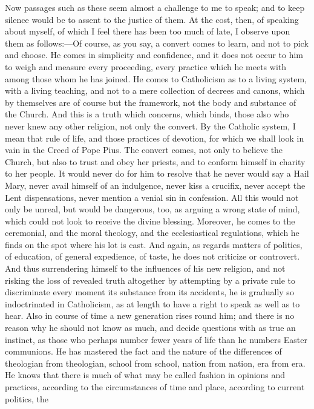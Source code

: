 Now passages such as these seem almost a challenge to me to speak;
and to keep silence would be to assent to the justice of them. At the
cost, then, of speaking about myself, of which I feel there has been too
much of late, I observe upon them as follows:—Of course, as you say, a
convert comes to learn, and not to pick and choose. He comes in
simplicity and confidence, and it does not occur to him to weigh and
measure every proceeding, every practice which he meets with among those
whom he has joined. He comes to Catholicism as to a living system, with
a living teaching, and not to a mere collection of decrees and canons,
which by themselves are of course but the framework, not the body and
substance of the Church. And this is a truth which concerns, which
binds, those also who never knew any other religion, not only the
convert. By the Catholic system, I mean that rule of life, and those
practices of devotion, for which we shall look in vain in the Creed of
Pope Pius. The convert comes, not only to believe the Church, but
also to trust and obey her priests, and to conform himself in charity to
her people. It would never do for him to resolve that he never would say
a Hail Mary, never avail himself of an indulgence, never kiss a
crucifix, never accept the Lent dispensations, never mention a venial
sin in confession. All this would not only be unreal, but would be
dangerous, too, as arguing a wrong state of mind, which could not look
to receive the divine blessing. Moreover, he comes to the ceremonial,
and the moral theology, and the ecclesiastical regulations, which he
finds on the spot where his lot is cast. And again, as regards matters
of politics, of education, of general expedience, of taste, he does not
criticize or controvert. And thus surrendering himself to the influences
of his new religion, and not risking the loss of revealed truth
altogether by attempting by a private rule to discriminate every moment
its substance from its accidents, he is gradually so indoctrinated in
Catholicism, as at length to have a right to speak as well as to hear.
Also in course of time a new generation rises round him; and there is no
reason why he should not know as much, and decide questions with as true
an instinct, as those who perhaps number fewer years of life than he
numbers Easter communions. He has mastered the fact and the nature of
the differences of theologian from theologian, school from school,
nation from nation, era from era. He knows that there is much of what
may be called fashion in opinions and practices, according to the
circumstances of time and place, according to current politics, the
